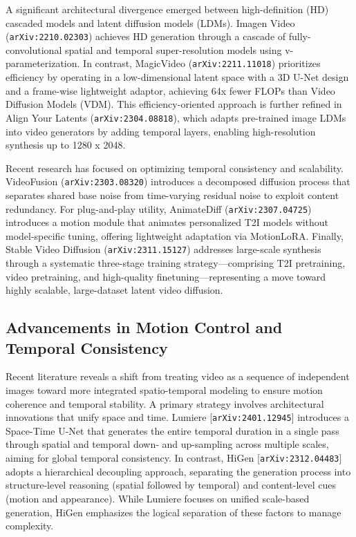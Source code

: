 \documentclass[11pt]{article}
\begin{document}
A significant architectural divergence emerged between high-definition (HD) cascaded models and latent diffusion models (LDMs). Imagen Video (\texttt{arXiv:2210.02303}) achieves HD generation through a cascade of fully-convolutional spatial and temporal super-resolution models using v-parameterization. In contrast, MagicVideo (\texttt{arXiv:2211.11018}) prioritizes efficiency by operating in a low-dimensional latent space with a 3D U-Net design and a frame-wise lightweight adaptor, achieving 64x fewer FLOPs than Video Diffusion Models (VDM). This efficiency-oriented approach is further refined in Align Your Latents (\texttt{arXiv:2304.08818}), which adapts pre-trained image LDMs into video generators by adding temporal layers, enabling high-resolution synthesis up to 1280 x 2048.

Recent research has focused on optimizing temporal consistency and scalability. VideoFusion (\texttt{arXiv:2303.08320}) introduces a decomposed diffusion process that separates shared base noise from time-varying residual noise to exploit content redundancy. For plug-and-play utility, AnimateDiff (\texttt{arXiv:2307.04725}) introduces a motion module that animates personalized T2I models without model-specific tuning, offering lightweight adaptation via MotionLoRA. Finally, Stable Video Diffusion (\texttt{arXiv:2311.15127}) addresses large-scale synthesis through a systematic three-stage training strategy—comprising T2I pretraining, video pretraining, and high-quality finetuning—representing a move toward highly scalable, large-dataset latent video diffusion.

\subsection{Advancements in Motion Control and Temporal Consistency}

Recent literature reveals a shift from treating video as a sequence of independent images toward more integrated spatio-temporal modeling to ensure motion coherence and temporal stability. A primary strategy involves architectural innovations that unify space and time. Lumiere [\texttt{arXiv:2401.12945}] introduces a Space-Time U-Net that generates the entire temporal duration in a single pass through spatial and temporal down- and up-sampling across multiple scales, aiming for global temporal consistency. In contrast, HiGen [\texttt{arXiv:2312.04483}] adopts a hierarchical decoupling approach, separating the generation process into structure-level reasoning (spatial followed by temporal) and content-level cues (motion and appearance). While Lumiere focuses on unified scale-based generation, HiGen emphasizes the logical separation of these factors to manage complexity.
\end{document}

